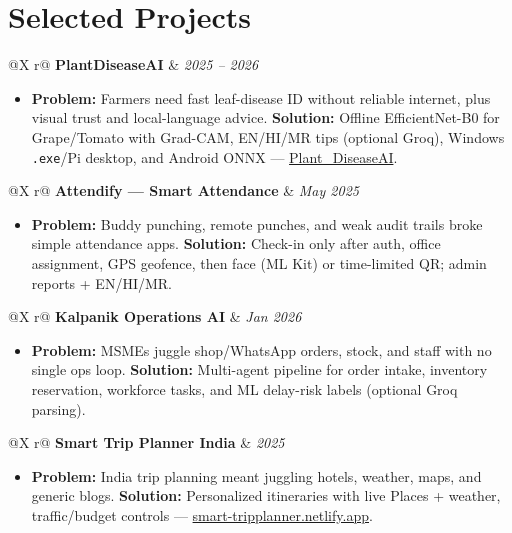\documentclass[9pt,a4paper]{extarticle}
\makeatletter
\newcommand{\role}[3]{%
  \noindent
  \begin{tabularx}{\textwidth}{@{}X r@{}}
    \textbf{#1} & \textit{\footnotesize #3} \\
    \multicolumn{2}{@{}l@{}}{\textcolor{muted}{\footnotesize #2}}
  \end{tabularx}\par\vspace{0.08em}%
}
\makeatother
\begin{document}
\section*{Selected Projects}

\role{PlantDiseaseAI}{Python, PyTorch, PySide6, ONNX, Android}{2025 -- 2026}
\begin{itemize}
  \item \textbf{Problem:} Farmers need fast leaf-disease ID without reliable internet, plus visual trust and local-language advice. \textbf{Solution:} Offline EfficientNet-B0 for Grape/Tomato with Grad-CAM, EN/HI/MR tips (optional Groq), Windows \texttt{.exe}/Pi desktop, and Android ONNX --- \href{https://github.com/jay-07-pixel/Plant_DiseaseAI}{Plant\_DiseaseAI}.
\end{itemize}

\vspace{0.08em}
\role{Attendify --- Smart Attendance}{Android $\cdot$ Firebase, ML Kit, CameraX, ZXing}{May 2025}
\begin{itemize}
  \item \textbf{Problem:} Buddy punching, remote punches, and weak audit trails broke simple attendance apps. \textbf{Solution:} Check-in only after auth, office assignment, GPS geofence, then face (ML Kit) or time-limited QR; admin reports + EN/HI/MR.
\end{itemize}

\vspace{0.08em}
\role{Kalpanik Operations AI}{Hackathon $\cdot$ Node.js, Express, Python, scikit-learn}{Jan 2026}
\begin{itemize}
  \item \textbf{Problem:} MSMEs juggle shop/WhatsApp orders, stock, and staff with no single ops loop. \textbf{Solution:} Multi-agent pipeline for order intake, inventory reservation, workforce tasks, and ML delay-risk labels (optional Groq parsing).
\end{itemize}

\vspace{0.08em}
\role{Smart Trip Planner India}{HTML, Tailwind, JS $\cdot$ Google Places, OpenWeatherMap}{2025}
\begin{itemize}
  \item \textbf{Problem:} India trip planning meant juggling hotels, weather, maps, and generic blogs. \textbf{Solution:} Personalized itineraries with live Places + weather, traffic/budget controls --- \href{https://smart-tripplanner.netlify.app/}{smart-tripplanner.netlify.app}.
\end{itemize}
\end{document}
